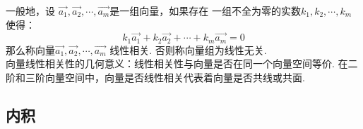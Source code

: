 \adddefination[线性相关性]
一般地，设 $\overrightarrow {a_1},\overrightarrow {a_2},\cdots ,\overrightarrow {a_m}$是一组向量，如果存在 一组不全为零的实数$k_1,k_2,\cdots ,k_m$使得：
\begin{equation}
	k_1\overrightarrow{a_1}+k_2\overrightarrow{a_2}+\cdots +k_m\overrightarrow{a_m}=0
	\label{线性相关}
\end{equation}
那么称向量$\overrightarrow {a_1},\overrightarrow {a_2},\cdots ,\overrightarrow {a_m}$ {\color{dy}线性相关}. 否则称向量组为{\color{dy}线性无关}.\\
\quad 向量线性相关性的几何意义：线性相关性与向量是否在同一个向量空间等价. 在二阶和三阶向量空间中，向量是否线性相关代表着向量是否共线或共面. 
\jg
\jg
\subsection{内积}
